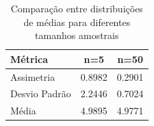 \begin{table}[h]
\centering
\begin{tabular}{|l|c|c|}
\hline
\textbf{Métrica} & \textbf{n=5} & \textbf{n=50} \\
\hline
Assimetria & 0.8982 & 0.2901 \\
\hline
Desvio Padrão & 2.2446 & 0.7024 \\
\hline
Média & 4.9895 & 4.9771 \\
\hline

\end{tabular}
\caption{Comparação entre distribuições de médias para diferentes tamanhos amostrais}
\label{tab:efeito_n}
\end{table}